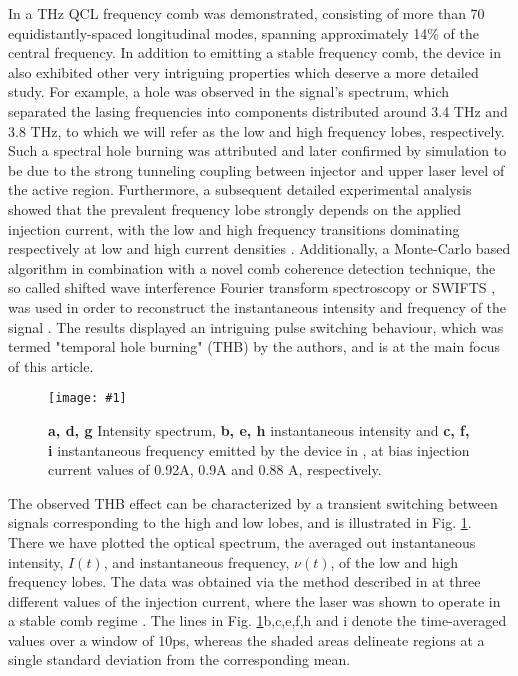 \documentclass[]{spie}  %
\newcommand{\includegraphicsXL}[1]{\texttt{[image: \#1]}}
\begin{document}
In  a THz QCL frequency comb was demonstrated, consisting of more than 70 equidistantly-spaced longitudinal modes, spanning approximately 14\% of the central frequency. In addition to emitting a stable frequency comb, the device in  also exhibited other very intriguing properties which deserve a more detailed study. For example, a hole was observed in the signal's spectrum, which separated the lasing frequencies into components distributed around 3.4 THz and 3.8 THz, to which we will refer  as the low and high frequency lobes, respectively. Such a spectral hole burning was attributed and later confirmed by simulation \cite{petz2016} to be due to the strong tunneling coupling between injector and upper laser level of the active region. Furthermore, a subsequent detailed experimental analysis \cite{burghoff2015evaluating} showed that the prevalent frequency lobe strongly depends on the applied injection current, with the low and high frequency transitions dominating respectively at low and high current densities \cite{burghoff2015evaluating}. Additionally, a Monte-Carlo based algorithm in combination with a novel comb coherence detection technique, the so called shifted wave interference Fourier transform spectroscopy or SWIFTS \cite{burghoff2014broadband}, was used in order to reconstruct the instantaneous intensity and frequency of the signal \cite{burghoff2015evaluating}. The results displayed an intriguing pulse switching behaviour, which was termed "temporal hole burning" (THB) by the authors, and is at the main focus of this article. 
\begin{figure}[h!]
	\begin{center}
		\includegraphicsXL{IMGS/exper_ALL.eps}
		\caption{\textbf{a, d, g} Intensity spectrum, \textbf{b, e, h} instantaneous intensity and \textbf{c, f, i} instantaneous frequency emitted by the device in , at bias injection current values of 0.92A, 0.9A and 0.88 A, respectively.} \label{fig:exper_ALL}
	\end{center}	
\end{figure}

The observed THB effect can be characterized by a transient switching between signals corresponding to the high and low lobes, and is illustrated in Fig. \ref{fig:exper_ALL}. There we have plotted  the optical spectrum, the averaged out instantaneous intensity, $I(t)$, and instantaneous frequency, $\nu(t)$, of the low and high frequency lobes. The data was obtained via the method described in  at three different values of the injection current, where the laser was shown to operate in a stable comb regime \cite{burghoff2014terahertz}. The lines in Fig. \ref{fig:exper_ALL}b,c,e,f,h and i denote the time-averaged values over a window of 10ps, whereas the shaded areas delineate regions at a single standard deviation from the corresponding mean.  
\end{document}
